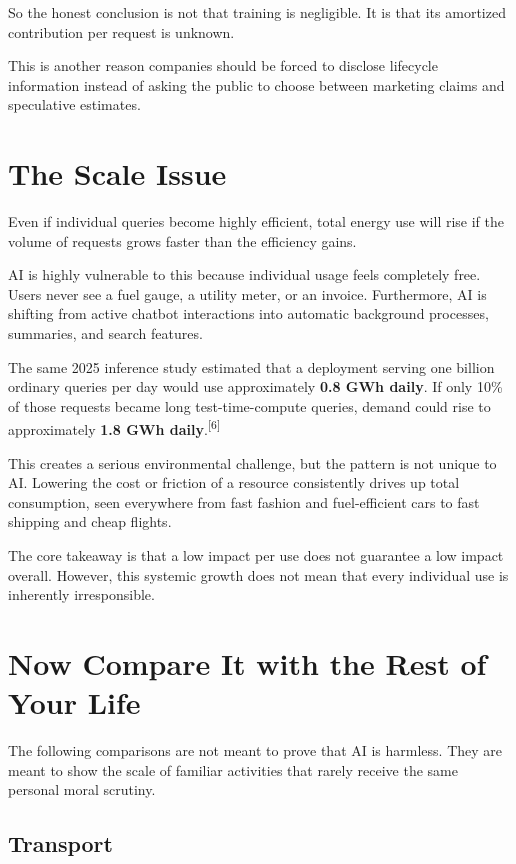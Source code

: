 \documentclass{article}
\begin{document}
So the honest conclusion is not that training is negligible. It is that its amortized contribution per request is unknown.

This is another reason companies should be forced to disclose lifecycle information instead of asking the public to choose between marketing claims and speculative estimates.

\section*{The Scale Issue}

Even if individual queries become highly efficient, total energy use will rise if the volume of requests grows faster than the efficiency gains.

AI is highly vulnerable to this because individual usage feels completely free. Users never see a fuel gauge, a utility meter, or an invoice. Furthermore, AI is shifting from active chatbot interactions into automatic background processes, summaries, and search features.

The same 2025 inference study estimated that a deployment serving one billion ordinary queries per day would use approximately \textbf{0.8 GWh daily}. If only 10\% of those requests became long test-time-compute queries, demand could rise to approximately \textbf{1.8 GWh daily}.\textsuperscript{[6]}

This creates a serious environmental challenge, but the pattern is not unique to AI. Lowering the cost or friction of a resource consistently drives up total consumption, seen everywhere from fast fashion and fuel-efficient cars to fast shipping and cheap flights.

The core takeaway is that a low impact per use does not guarantee a low impact overall. However, this systemic growth does not mean that every individual use is inherently irresponsible.

\section*{Now Compare It with the Rest of Your Life}

The following comparisons are not meant to prove that AI is harmless. They are meant to show the scale of familiar activities that rarely receive the same personal moral scrutiny.

\subsection*{Transport}
\end{document}
